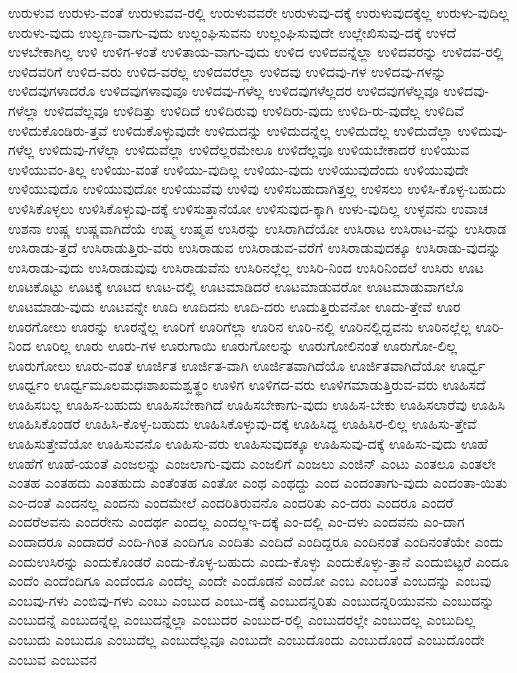 {ಉರುಳುವ
ಉರುಳು-ವಂತೆ
ಉರುಳುವವ-ರಲ್ಲಿ
ಉರುಳುವವರೇ
ಉರುಳುವು-ದಕ್ಕೆ
ಉರುಳುವುದಕ್ಕೆಲ್ಲ
ಉರುಳು-ವುದಿಲ್ಲ
ಉರುಳು-ವುದು
ಉಲ್ಬಣ-ವಾಗು-ವುದು
ಉಲ್ಲಂಘಿಸುವನು
ಉಲ್ಲಂಘಿಸುವುದೇ
ಉಲ್ಲೇಖಿಸುವು-ದಕ್ಕೆ
ಉಳದೆ
ಉಳಬೇಕಾಗಿಲ್ಲ
ಉಳಿ
ಉಳಿಗ-ಳಂತೆ
ಉಳಿತಾಯ-ವಾಗು-ವುದು
ಉಳಿದ
ಉಳಿದವನ್ನೆಲ್ಲಾ
ಉಳಿದವರನ್ನು
ಉಳಿದವ-ರಲ್ಲಿ
ಉಳಿದವರಿಗೆ
ಉಳಿದ-ವರು
ಉಳಿದ-ವರೆಲ್ಲ
ಉಳಿದವರೆಲ್ಲಾ
ಉಳಿದವು
ಉಳಿದವು-ಗಳ
ಉಳಿದವು-ಗಳನ್ನು
ಉಳಿದವುಗಳಾದರೊ
ಉಳಿದವುಗಳಾವುವೂ
ಉಳಿದವು-ಗಳೆಲ್ಲ
ಉಳಿದವುಗಳೆಲ್ಲದರ
ಉಳಿದವುಗಳೆಲ್ಲವೂ
ಉಳಿದವು-ಗಳೆಲ್ಲಾ
ಉಳಿದವೆಲ್ಲವೂ
ಉಳಿದಿತ್ತು
ಉಳಿದಿದೆ
ಉಳಿದಿರುವು
ಉಳಿದಿರು-ವುದು
ಉಳಿದಿ-ರು-ವುದೆಲ್ಲ
ಉಳಿದಿವೆ
ಉಳಿದುಕೊಂಡಿರು-ತ್ತವೆ
ಉಳಿದುಕೊಳ್ಳುವುದೇ
ಉಳಿದುದನ್ನು
ಉಳಿದುದನ್ನೆಲ್ಲ
ಉಳಿದುದೆಲ್ಲ
ಉಳಿದುದೆಲ್ಲಾ
ಉಳಿದುವು-ಗಳೆಲ್ಲ
ಉಳಿದುವು-ಗಳೆಲ್ಲಾ
ಉಳಿದುವೆಲ್ಲಾ
ಉಳಿದೆಲ್ಲರಮೇಲೂ
ಉಳಿದೆಲ್ಲವೂ
ಉಳಿಯಬೇಕಾದರೆ
ಉಳಿಯುವ
ಉಳಿಯುವಂ-ತಿಲ್ಲ
ಉಳಿಯು-ವಂತೆ
ಉಳಿಯು-ವುದಿಲ್ಲ
ಉಳಿಯು-ವುದು
ಉಳಿಯುವುದೆಂದು
ಉಳಿಯುವುದೇ
ಉಳಿಯುವುದೊ
ಉಳಿಯುವುದೋ
ಉಳಿಯುವೆವು
ಉಳಿವು
ಉಳಿಸಬಹುದಾಗಿತ್ತಲ್ಲ
ಉಳಿಸಲು
ಉಳಿಸಿ-ಕೊಳ್ಳ-ಬಹುದು
ಉಳಿಸಿಕೊಳ್ಳಲು
ಉಳಿಸಿಕೊಳ್ಳುವು-ದಕ್ಕೆ
ಉಳಿಸುತ್ತಾನೆಯೋ
ಉಳಿಸುವುದ-ಕ್ಕಾಗಿ
ಉಳು-ವುದಿಲ್ಲ
ಉಳ್ಳವನು
ಉವಾಚ
ಉಶನಾ
ಉಷ್ಣ
ಉಷ್ಣವಾಗಿದೆಯೆ
ಉಷ್ಮ
ಉಷ್ಮಪ
ಉಸಿರನ್ನು
ಉಸಿರಾಗಿದೆಯೋ
ಉಸಿರಾಟ
ಉಸಿರಾಟ-ವನ್ನು
ಉಸಿರಾಡ
ಉಸಿರಾಡು-ತ್ತದೆ
ಉಸಿರಾಡುತ್ತಿರು-ವರು
ಉಸಿರಾಡುವ
ಉಸಿರಾಡುವ-ವರೆಗೆ
ಉಸಿರಾಡುವುದಕ್ಕೂ
ಉಸಿರಾಡು-ವುದನ್ನು
ಉಸಿರಾಡು-ವುದು
ಉಸಿರಾಡುವುವು
ಉಸಿರಾಡುವೆನು
ಉಸಿರಿನಲ್ಲೆಲ್ಲ
ಉಸಿರಿ-ನಿಂದ
ಉಸಿರಿನಿಂದಲೆ
ಉಸಿರು
ಊಟ
ಊಟಕೊಟ್ಟು
ಊಟಕ್ಕೆ
ಊಟದ
ಊಟ-ದಲ್ಲಿ
ಊಟಮಾಡಿದರೆ
ಊಟಮಾಡುವರೋ
ಊಟಮಾಡುವಾಗಲೊ
ಊಟಮಾಡು-ವುದು
ಊಟವನ್ನೇ
ಊದಿ
ಊದಿದನು
ಊದಿ-ದರು
ಊದುತ್ತಿರುವನೋ
ಊದು-ತ್ತೇವೆ
ಊರ
ಊರಗೋಲು
ಊರನ್ನು
ಊರನ್ನೆಲ್ಲ
ಊರಿಗೆ
ಊರಿಗೆಲ್ಲಾ
ಊರಿನ
ಊರಿ-ನಲ್ಲಿ
ಊರಿನಲ್ಲಿದ್ದವನು
ಊರಿನಲ್ಲೆಲ್ಲ
ಊರಿ-ನಿಂದ
ಊರಿಲ್ಲ
ಊರು
ಊರು-ಗಳ
ಊರುಗಾಯಿ
ಊರುಗೋಲನ್ನು
ಊರುಗೋಲಿನಂತೆ
ಊರುಗೋ-ಲಿಲ್ಲ
ಊರುಗೋಲು
ಊರು-ವಂತೆ
ಊರ್ಜಿತ
ಊರ್ಜಿತ-ವಾಗಿ
ಊರ್ಜಿತವಾಗಿದೆಯೊ
ಊರ್ಜಿತವಾಗಿದೆಯೋ
ಊರ್ಧ್ವ
ಊರ್ಧ್ವಂ
ಊರ್ಧ್ವಮೂಲಮಧಃಶಾಖಮಶ್ವತ್ಥಂ
ಊಳಿಗ
ಊಳಿಗದ-ವರು
ಊಳಿಗಮಾಡುತ್ತಿರುವ-ವರು
ಊಹಿಸದೆ
ಊಹಿಸಬಲ್ಲ
ಊಹಿಸ-ಬಹುದು
ಊಹಿಸಬೇಕಾಗಿದೆ
ಊಹಿಸಬೇಕಾಗು-ವುದು
ಊಹಿಸ-ಬೇಕು
ಊಹಿಸಲಾರೆವು
ಊಹಿಸಿ
ಊಹಿಸಿಕೊಂಡರೆ
ಊಹಿಸಿ-ಕೊಳ್ಳ-ಬಹುದು
ಊಹಿಸಿಕೊಳ್ಳುವು-ದಕ್ಕೆ
ಊಹಿಸಿದ್ದ
ಊಹಿಸಿರ-ಲಿಲ್ಲ
ಊಹಿಸು-ತ್ತೇವೆ
ಊಹಿಸುತ್ತೇವೆಯೋ
ಊಹಿಸುವನೊ
ಊಹಿಸು-ವರು
ಊಹಿಸುವುದಕ್ಕೂ
ಊಹಿಸುವು-ದಕ್ಕೆ
ಊಹಿಸು-ವುದು
ಊಹೆ
ಊಹೆಗೆ
ಊಹೆ-ಯಂತೆ
ಎಂಜಲನ್ನು
ಎಂಜಲಾಗು-ವುದು
ಎಂಜಲಿಗೆ
ಎಂಜಲು
ಎಂಜಿನ್
ಎಂಟು
ಎಂತಲೂ
ಎಂತಲೇ
ಎಂತಹ
ಎಂತಹದು
ಎಂತಹುದು
ಎಂತೆಂತಹ
ಎಂತೋ
ಎಂಥ
ಎಂಥದ್ದು
ಎಂದ
ಎಂದಂತಾಗು-ವುದು
ಎಂದಂತಾ-ಯಿತು
ಎಂ-ದಂತೆ
ಎಂದನಲ್ಲ
ಎಂದನು
ಎಂದಮೇಲೆ
ಎಂದರಿತಿರುವನೊ
ಎಂದರಿತು
ಎಂ-ದರು
ಎಂದರೂ
ಎಂದರೆ
ಎಂದರೆಅವನು
ಎಂದರೇನು
ಎಂದರ್ಥ
ಎಂದಲ್ಲ
ಎಂದಲ್ಲಇ-ದಕ್ಕೆ
ಎಂ-ದಲ್ಲಿ
ಎಂ-ದಳು
ಎಂದವನು
ಎಂ-ದಾಗ
ಎಂದಾದರೂ
ಎಂದಾದರೆ
ಎಂದಿ-ಗಿಂತ
ಎಂದಿಗೂ
ಎಂದಿತು
ಎಂದಿದೆ
ಎಂದಿದ್ದರೂ
ಎಂದಿನಂತೆ
ಎಂದಿನಂತೆಯೇ
ಎಂದು
ಎಂದುಉಸಿರನ್ನು
ಎಂದುಕೊಂಡರೆ
ಎಂದು-ಕೊಳ್ಳ-ಬಹುದು
ಎಂದು-ಕೊಳ್ಳು
ಎಂದುಕೊಳ್ಳು-ತ್ತಾನೆ
ಎಂದುಬಿಟ್ಟರೆ
ಎಂದೂ
ಎಂದೆಂ
ಎಂದೆಂದಿಗೂ
ಎಂದೆಂದೂ
ಎಂದೆಲ್ಲ
ಎಂದೇ
ಎಂದೊಡನೆ
ಎಂದೋ
ಎಂಬ
ಎಂಬಂತೆ
ಎಂಬದನ್ನು
ಎಂಬವು
ಎಂಬವು-ಗಳು
ಎಂಬಿವು-ಗಳು
ಎಂಬು
ಎಂಬುದ
ಎಂಬು-ದಕ್ಕೆ
ಎಂಬುದನ್ನರಿತು
ಎಂಬುದನ್ನರಿಯುವನು
ಎಂಬುದನ್ನು
ಎಂಬುದನ್ನೆ
ಎಂಬುದನ್ನೆಲ್ಲ
ಎಂಬುದನ್ನೆಲ್ಲಾ
ಎಂಬುದರ
ಎಂಬುದ-ರಲ್ಲಿ
ಎಂಬುದರಲ್ಲೇ
ಎಂಬುದಲ್ಲ
ಎಂಬುದಿಲ್ಲ
ಎಂಬುದು
ಎಂಬುದೂ
ಎಂಬುದೆಲ್ಲ
ಎಂಬುದೆಲ್ಲವೂ
ಎಂಬುದೇ
ಎಂಬುದೊಂದು
ಎಂಬುದೊಂದೆ
ಎಂಬುದೊಂದೇ
ಎಂಬುವ
ಎಂಬುವನ
}
